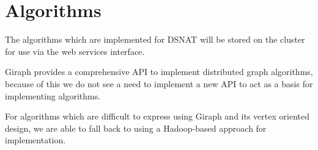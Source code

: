 \section{Algorithms}
The algorithms which are implemented for DSNAT will be stored on the cluster for use via the web services interface.

Giraph provides a comprehensive API to implement distributed graph algorithms, because of this we do not see a need to implement a new API to act as a basis for implementing algorithms.

For algorithms which are difficult to express using Giraph and its vertex oriented design, we are able to fall back to using a Hadoop-based approach for implementation.



